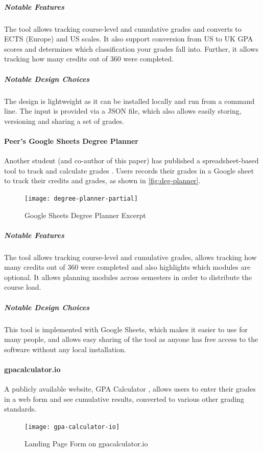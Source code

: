 \subparagraph{Notable Features}
The tool allows tracking course-level and cumulative grades and converts to ECTS (Europe) and US scales. It also support conversion from US to UK GPA scores and determines which classification your grades fall into. Further, it allows tracking how many credits out of 360 were completed.

\subparagraph{Notable Design Choices}
The design is lightweight as it can be installed locally and run from a command line. The input is provided via a JSON file, which also allows easily storing, versioning and sharing a set of grades.

\paragraph{Peer's Google Sheets Degree Planner}
Another student (and co-author of this paper) has published a spreadsheet-based tool to track and calculate grades \cite{muralidharan_2020}. Users records their grades in a Google sheet to track their credits and grades, as shown in \autoref{fig:deg-planner}.
\begin{figure}[H]
\noindent \texttt{[image: degree-planner-partial]}
\centering
\caption{Google Sheets Degree Planner Excerpt}
\label{fig:deg-planner}
\end{figure}

\subparagraph{Notable Features}
The tool allows tracking course-level and cumulative grades, allows tracking how many credits out of 360 were completed and also highlights which modules are optional. It allows planning modules across semesters in order to distribute the course load.

\subparagraph{Notable Design Choices}
This tool is implemented with Google Sheets, which makes it easier to use for many people, and allows easy sharing of the tool as anyone has free access to the software without any local installation.

\paragraph{gpacalculator.io}

A publicly available website, GPA Calculator \cite{gpa_calculator}, allows users to enter their grades in a web form and see cumulative results, converted to various other grading standards.

\begin{figure}[H] 
\noindent \texttt{[image: gpa-calculator-io]}
\centering
\caption{Landing Page Form on gpacalculator.io}
\label{fig:gpa-calc}
\end{figure}
\medskip


